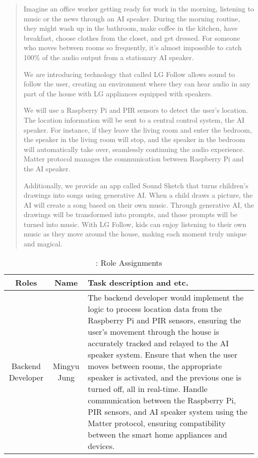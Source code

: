 \documentclass[conference]{IEEEtran}
\begin{document}
\begin{abstract}
    Imagine an office worker getting ready for work in the morning, listening to music or the news through an AI speaker. During the morning routine, they might wash up in the bathroom, make coffee in the kitchen, have breakfast, choose clothes from the closet, and get dressed. For someone who moves between rooms so frequently, it's almost impossible to catch 100\% of the audio output from a stationary AI speaker.
    
    We are introducing technology that called LG Follow allows sound to follow the user, creating an environment where they can hear audio in any part of the house with LG appliances equipped with speakers.
    
    We will use a Raspberry Pi and PIR sensors to detect the user's location. The location information will be sent to a central control system, the AI speaker. For instance, if they leave the living room and enter the bedroom, the speaker in the living room will stop, and the speaker in the bedroom will automatically take over, seamlessly continuing the audio experience. Matter protocol manages the communication between Raspberry Pi and the AI speaker.
    
    Additionally, we provide an app called Sound Sketch that turns children's drawings into songs using generative AI. When a child draws a picture, the AI will create a song based on their own music. Through generative AI, the drawings will be transformed into prompts, and those prompts will be turned into music. With LG Follow, kids can enjoy listening to their own music as they move around the house, making each moment truly unique and magical.

\end{abstract}





\begin{table}[h!]
\centering
\caption{: Role Assignments}
\begin{tabular}{|c|c|p{3.5cm}|}
\hline
\textbf{Roles} & \textbf{Name} & \textbf{Task description and etc.} \\
\hline
Backend Developer & Mingyu Jung & The backend developer would implement the logic to process location data from the Raspberry Pi and PIR sensors, ensuring the user’s movement through the house is accurately tracked and relayed to the AI speaker system. Ensure that when the user moves between rooms, the appropriate speaker is activated, and the previous one is turned off, all in real-time. Handle communication between the Raspberry Pi, PIR sensors, and AI speaker system using the Matter protocol, ensuring compatibility between the smart home appliances and devices. \\
\hline

\end{tabular}
\end{table}
\end{document}
